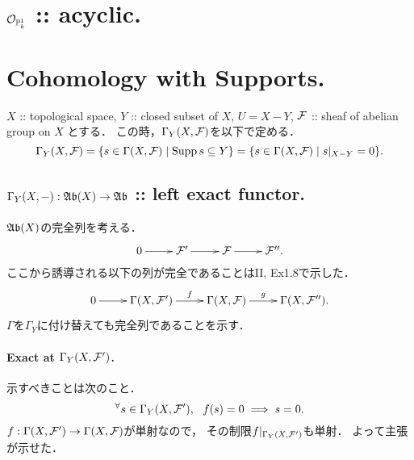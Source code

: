\documentclass[a4paper]{jsarticle}
\begin{document}

\section{$\mathcal{O}_{\mathbb{P}^1_k}$ :: acyclic.} %

\section{Cohomology with Supports.} %
    $X$ :: topological space,
    $Y$ :: closed subset of $X$,
    $U=X-Y$,
    $\mathcal{F}$ :: sheaf of abelian group on $X$
    とする．
    この時，$\Gamma_Y(X, \mathcal{F})$を以下で定める．
    \[
        \Gamma_Y(X, \mathcal{F})
        =\{ s \in \Gamma(X, \mathcal{F}) \mid \operatorname{Supp} s \subseteq Y \}
        =\{ s \in \Gamma(X, \mathcal{F}) \mid s|_{X-Y}=0 \}.
    \]

    \subsection{$\Gamma_Y(X,-): \mathfrak{Ab}(X) \to \mathfrak{Ab}$ :: left exact functor.}
    $\mathfrak{Ab}(X)$の完全列を考える．
    \[\xymatrix{ 0 \ar[r]& \shF' \ar[r]& \shF \ar[r]& \shF''. }\]
    ここから誘導される以下の列が完全であることはII, Ex1.8で示した．
    \[\xymatrix{ 0 \ar[r]& \Gamma(X,\shF') \ar[r]^-{f}& \Gamma(X,\shF) \ar[r]^-{g}& \Gamma(X,\shF''). }\]
    $\Gamma$を$\Gamma_Y$に付け替えても完全列であることを示す．

    \paragraph{Exact at $\Gamma_Y(X,\mathcal{F}')$.}
    示すべきことは次のこと．
    \[ {}^{\forall} s \in \Gamma_Y(X,\mathcal{F}'),~~ f(s)=0 \implies s=0. \]
    $f: \Gamma(X,\mathcal{F}') \to \Gamma(X,\mathcal{F})$が単射なので，
    その制限$f|_{\Gamma_Y(X,\mathcal{F}')}$も単射．
    よって主張が示せた．
\end{document}
